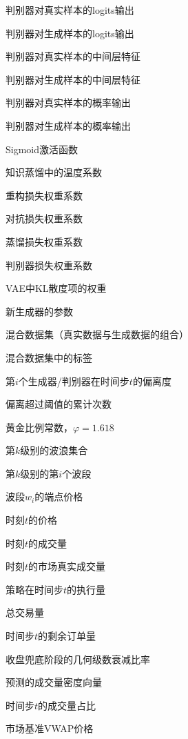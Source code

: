\item[$z_{\text{real}}$] 判别器对真实样本的logits输出
\item[$z_{\text{fake}}$] 判别器对生成样本的logits输出
\item[$f_{\text{real}}$] 判别器对真实样本的中间层特征
\item[$f_{\text{fake}}$] 判别器对生成样本的中间层特征
\item[$p_{\text{real}}$] 判别器对真实样本的概率输出
\item[$p_{\text{fake}}$] 判别器对生成样本的概率输出
\item[$\sigma(\cdot)$] Sigmoid激活函数
\item[$\tau$] 知识蒸馏中的温度系数
\item[$\lambda_{\text{rec}}$] 重构损失权重系数
\item[$\lambda_{\text{adv}}$] 对抗损失权重系数
\item[$\lambda_{\text{distill}}$] 蒸馏损失权重系数
\item[$\lambda_D$] 判别器损失权重系数
\item[$\beta$] VAE中KL散度项的权重
\item[$\boldsymbol{w}_{G_{\text{new}}}$] 新生成器的参数
\item[$S^*$] 混合数据集（真实数据与生成数据的组合）
\item[$y^*$] 混合数据集中的标签
\item[$\Delta_i^{(t)}$] 第$i$个生成器/判别器在时间步$t$的偏离度
\item[$N_i$] 偏离超过阈值的累计次数
\item[$\varphi$] 黄金比例常数，$\varphi = 1.618$
\item[$W^{(k)}$] 第$k$级别的波浪集合
\item[$w_i^{(k)}$] 第$k$级别的第$i$个波段
\item[$P(w_i)$] 波段$w_i$的端点价格
\item[$P_t$] 时刻$t$的价格
\item[$V_t$] 时刻$t$的成交量
\item[$V_t^{\mathrm{mkt}}$] 时刻$t$的市场真实成交量
\item[$q_t$] 策略在时间步$t$的执行量
\item[$Q_{\text{total}}$] 总交易量
\item[$R_t$] 时间步$t$的剩余订单量
\item[$r$] 收盘兜底阶段的几何级数衰减比率
\item[$\hat{\mathbf{v}}$] 预测的成交量密度向量
\item[$v_t$] 时间步$t$的成交量占比
\item[$P_{\mathrm{VWAP}}$] 市场基准VWAP价格
